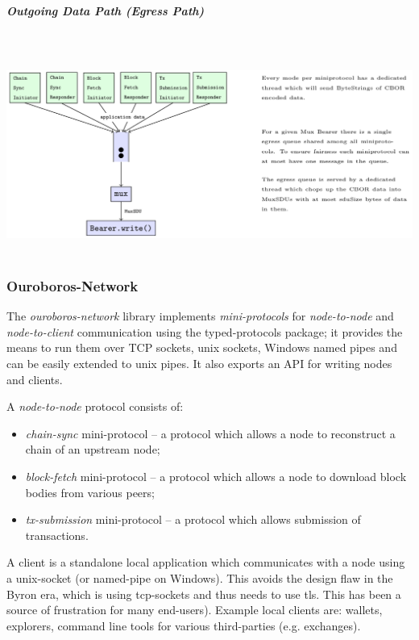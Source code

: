 \documentclass[11pt,a4paper]{article}
\begin{document}
\subparagraph{Outgoing Data Path (Egress Path)}

~\\
\includegraphics[width=6.27083in,height=2.59722in]{./media/image6.png}

\subsubsection{Ouroboros-Network}
\label{ouroboros-network}

The \emph{ouroboros-network} library implements \emph{mini-protocols}
for \emph{node-to-node} and \emph{node-to-client} communication using
the typed-protocols package; it provides the means to run them over TCP
sockets, unix sockets, Windows named pipes and can be easily extended to
unix pipes. It also exports an API for writing nodes and clients.

A \emph{node-to-node} protocol consists of:

\begin{itemize}
\item
  \emph{chain-sync} mini-protocol -- a protocol which allows a node to
  reconstruct a chain of an upstream node;
\item
  \emph{block-fetch} mini-protocol -- a protocol which allows a node
  to download block bodies from various peers;
\item
  \emph{tx-submission} mini-protocol -- a protocol which allows
  submission of transactions.
\end{itemize}

A client is a standalone local application which communicates with a
node using a unix-socket (or named-pipe on Windows). This avoids the
design flaw in the Byron era, which is using tcp-sockets and thus needs
to use tls. This has been a source of frustration for many end-users).
Example local clients are: wallets, explorers, command line tools for
various third-parties (e.g. exchanges).
\end{document}
